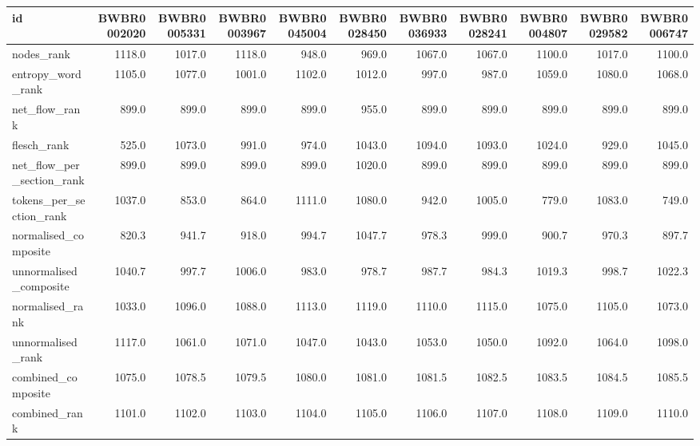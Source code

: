 \begin{tabular}{lrrrrrrrrrr}
\toprule
id & BWBR0002020 & BWBR0005331 & BWBR0003967 & BWBR0045004 & BWBR0028450 & BWBR0036933 & BWBR0028241 & BWBR0004807 & BWBR0029582 & BWBR0006747 \\
\midrule
nodes\_rank & 1118.0 & 1017.0 & 1118.0 & 948.0 & 969.0 & 1067.0 & 1067.0 & 1100.0 & 1017.0 & 1100.0 \\
\cline{1-11}
entropy\_word\_rank & 1105.0 & 1077.0 & 1001.0 & 1102.0 & 1012.0 & 997.0 & 987.0 & 1059.0 & 1080.0 & 1068.0 \\
\cline{1-11}
net\_flow\_rank & 899.0 & 899.0 & 899.0 & 899.0 & 955.0 & 899.0 & 899.0 & 899.0 & 899.0 & 899.0 \\
\cline{1-11}
flesch\_rank & 525.0 & 1073.0 & 991.0 & 974.0 & 1043.0 & 1094.0 & 1093.0 & 1024.0 & 929.0 & 1045.0 \\
\cline{1-11}
net\_flow\_per\_section\_rank & 899.0 & 899.0 & 899.0 & 899.0 & 1020.0 & 899.0 & 899.0 & 899.0 & 899.0 & 899.0 \\
\cline{1-11}
tokens\_per\_section\_rank & 1037.0 & 853.0 & 864.0 & 1111.0 & 1080.0 & 942.0 & 1005.0 & 779.0 & 1083.0 & 749.0 \\
\cline{1-11}
normalised\_composite & 820.3 & 941.7 & 918.0 & 994.7 & 1047.7 & 978.3 & 999.0 & 900.7 & 970.3 & 897.7 \\
\cline{1-11}
unnormalised\_composite & 1040.7 & 997.7 & 1006.0 & 983.0 & 978.7 & 987.7 & 984.3 & 1019.3 & 998.7 & 1022.3 \\
\cline{1-11}
normalised\_rank & 1033.0 & 1096.0 & 1088.0 & 1113.0 & 1119.0 & 1110.0 & 1115.0 & 1075.0 & 1105.0 & 1073.0 \\
\cline{1-11}
unnormalised\_rank & 1117.0 & 1061.0 & 1071.0 & 1047.0 & 1043.0 & 1053.0 & 1050.0 & 1092.0 & 1064.0 & 1098.0 \\
\cline{1-11}
combined\_composite & 1075.0 & 1078.5 & 1079.5 & 1080.0 & 1081.0 & 1081.5 & 1082.5 & 1083.5 & 1084.5 & 1085.5 \\
\cline{1-11}
combined\_rank & 1101.0 & 1102.0 & 1103.0 & 1104.0 & 1105.0 & 1106.0 & 1107.0 & 1108.0 & 1109.0 & 1110.0 \\
\cline{1-11}
\bottomrule
\end{tabular}
